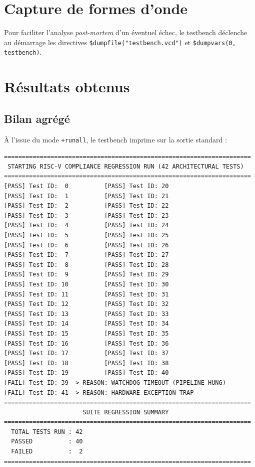 \documentclass[11pt,a4paper,oneside]{report}
\begin{document}
\section{Capture de formes d'onde}
Pour faciliter l'analyse \textit{post-mortem} d'un éventuel
échec, le testbench déclenche au démarrage les directives
\texttt{\$dumpfile("testbench.vcd")} et
\texttt{\$dumpvars(0, testbench)}.


\section{Résultats obtenus}
\subsection{Bilan agrégé}
À l'issue du mode \texttt{+runall}, le testbench imprime sur
la sortie standard :
\begin{verbatim}
=====================================================================
 STARTING RISC-V COMPLIANCE REGRESSION RUN (42 ARCHITECTURAL TESTS)
=====================================================================
[PASS] Test ID:  0          [PASS] Test ID: 20
[PASS] Test ID:  1          [PASS] Test ID: 21
[PASS] Test ID:  2          [PASS] Test ID: 22
[PASS] Test ID:  3          [PASS] Test ID: 23
[PASS] Test ID:  4          [PASS] Test ID: 24
[PASS] Test ID:  5          [PASS] Test ID: 25
[PASS] Test ID:  6          [PASS] Test ID: 26
[PASS] Test ID:  7          [PASS] Test ID: 27
[PASS] Test ID:  8          [PASS] Test ID: 28
[PASS] Test ID:  9          [PASS] Test ID: 29
[PASS] Test ID: 10          [PASS] Test ID: 30
[PASS] Test ID: 11          [PASS] Test ID: 31
[PASS] Test ID: 12          [PASS] Test ID: 32
[PASS] Test ID: 13          [PASS] Test ID: 33
[PASS] Test ID: 14          [PASS] Test ID: 34
[PASS] Test ID: 15          [PASS] Test ID: 35
[PASS] Test ID: 16          [PASS] Test ID: 36
[PASS] Test ID: 17          [PASS] Test ID: 37
[PASS] Test ID: 18          [PASS] Test ID: 38
[PASS] Test ID: 19          [PASS] Test ID: 40
[FAIL] Test ID: 39 -> REASON: WATCHDOG TIMEOUT (PIPELINE HUNG)
[FAIL] Test ID: 41 -> REASON: HARDWARE EXCEPTION TRAP
=====================================================================
                      SUITE REGRESSION SUMMARY
=====================================================================
  TOTAL TESTS RUN : 42
  PASSED          : 40
  FAILED          :  2
=====================================================================
\end{verbatim}
\end{document}
